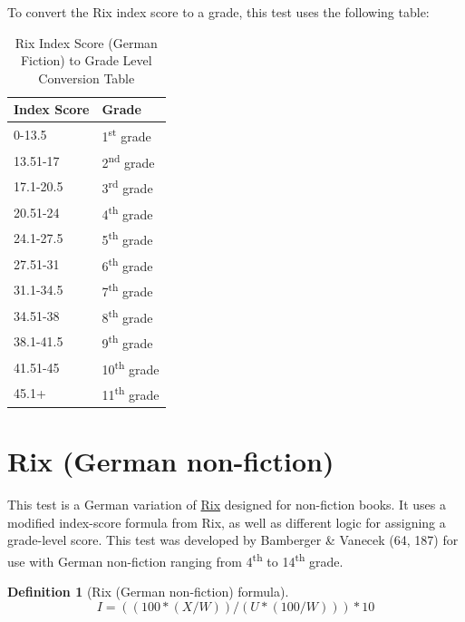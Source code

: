 \documentclass[
]{book}
\theoremstyle{definition}
\newtheorem{definition}{Definition}[chapter]
\theoremstyle{definition}
\theoremstyle{definition}
\theoremstyle{definition}
\theoremstyle{remark}
\begin{document}
\begin{minipage}{\textwidth}

To convert the Rix index score to a grade, this test uses the following table:

\begin{table}

\caption{\label{tab:unnamed-chunk-50}Rix Index Score (German Fiction) to Grade Level Conversion Table}
\centering
\begin{tabular}[t]{ll}
\toprule
Index Score & Grade\\
\midrule
0-13.5 & 1\textsuperscript{st} grade\\
13.51-17 & 2\textsuperscript{nd} grade\\
17.1-20.5 & 3\textsuperscript{rd} grade\\
20.51-24 & 4\textsuperscript{th} grade\\
24.1-27.5 & 5\textsuperscript{th} grade\\
27.51-31 & 6\textsuperscript{th} grade\\
31.1-34.5 & 7\textsuperscript{th} grade\\
34.51-38 & 8\textsuperscript{th} grade\\
38.1-41.5 & 9\textsuperscript{th} grade\\
41.51-45 & 10\textsuperscript{th} grade\\
45.1+ & 11\textsuperscript{th} grade\\
\bottomrule
\end{tabular}
\end{table}

\end{minipage}

\newpage

\hypertarget{rix-german-nonfiction}{%
\section{\texorpdfstring{Rix (German non-fiction)}{Rix (German non-fiction)}}\label{rix-german-nonfiction}}

This test is a German variation of \protect\hyperlink{rix-test}{Rix} designed for non-fiction books. It uses a modified index-score formula from Rix, as well as different logic for assigning a grade-level score. This test was developed by Bamberger \& Vanecek (64, 187) for use with German non-fiction ranging from 4\textsuperscript{th} to 14\textsuperscript{th} grade.

\begin{definition}[Rix (German non-fiction) formula]
\protect\hypertarget{def:rixnonfictionde}{}{\label{def:rixnonfictionde} {} }\[
I = ((100*(X/W))/(U*(100/W))) * 10
\]
\end{definition}
\end{document}
